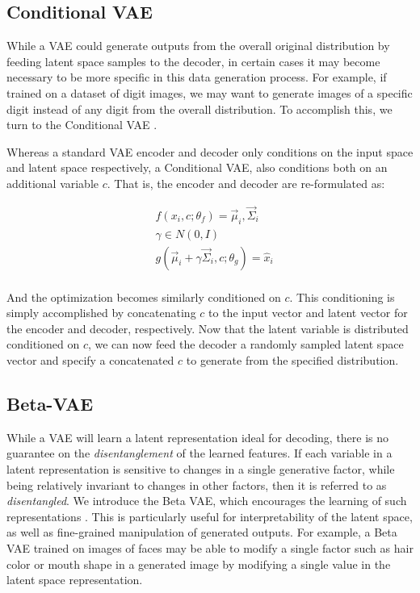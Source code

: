 \subsection{Conditional VAE}

While a VAE could generate outputs from the overall original
distribution by feeding latent space samples to the decoder, in
certain cases it may become necessary to be more specific in this
data generation process. For example, if trained on a dataset of
digit images, we may want to generate images of a specific digit
instead of any digit from the overall distribution. To accomplish
this, we turn to the Conditional VAE \cite{sohn2015learning}.

Whereas a standard VAE encoder and decoder only conditions on the
input space and latent space respectively, a Conditional VAE, also
conditions both on an additional variable $c$. That is, the encoder
and decoder are re-formulated as:

\begin{align*}
    &f(x_i, c ;\theta_f) = \vec{\mu}_i, \vec{\Sigma}_i \\
    &\gamma \in N(0,I) \\
    &g(\vec{\mu}_i + \gamma \vec{\Sigma}_i, c; \theta_g) = \hat{x}_i \\
\end{align*}

And the optimization becomes similarly conditioned on $c$. This
conditioning is simply accomplished by concatenating $c$ to the input
vector and latent vector for the encoder and decoder, respectively.
Now that the latent variable is distributed conditioned on $c$, we
can now feed the decoder a randomly sampled latent space vector and
specify a concatenated $c$ to generate from the specified
distribution.

\subsection{Beta-VAE}

While a VAE will learn a latent representation ideal for decoding,
there is no guarantee on the \textit{disentanglement} of the learned
features. If each variable in a latent representation is sensitive to
changes in a single generative factor, while being relatively
invariant to changes in other factors, then it is referred to as
\textit{disentangled}. We introduce the Beta VAE, which encourages
the learning of such representations \cite{higgins2017beta}. This is
particularly useful for interpretability of the latent space, as well
as fine-grained manipulation of generated outputs. For example, a
Beta VAE trained on images of faces may be able to modify a single
factor such as hair color or mouth shape in a generated image by
modifying a single value in the latent space representation.

